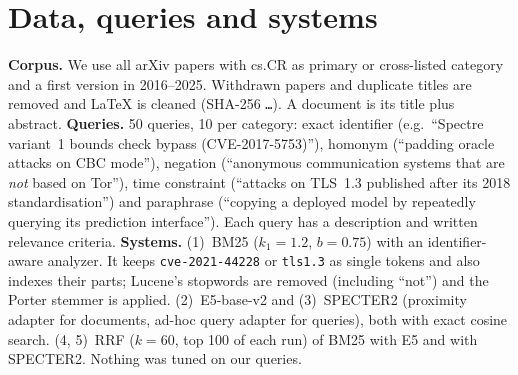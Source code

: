 \documentclass[10pt,a4paper]{article}
\begin{document}
\section{Data, queries and systems}
\textbf{Corpus.} We use all \corpusN{} arXiv papers with cs.CR as primary or cross-listed category
and a first version in 2016--2025. Withdrawn papers and duplicate titles are removed and LaTeX is
cleaned (SHA-256 \texttt{\corpusSha\ldots}). A document is its title plus abstract.
\textbf{Queries.} 50 queries, 10 per category: exact identifier (e.g.\ ``Spectre variant~1 bounds check
bypass (CVE-2017-5753)''), homonym (``padding oracle attacks on CBC mode''), negation (``anonymous
communication systems that are \emph{not} based on Tor''), time constraint (``attacks on TLS~1.3
published after its 2018 standardisation'') and paraphrase (``copying a deployed model by repeatedly
querying its prediction interface''). Each query has a description and written relevance criteria.
\textbf{Systems.} (1)~BM25 ($k_1{=}1.2$, $b{=}0.75$) with an identifier-aware analyzer. It keeps
\texttt{cve-2021-44228} or \texttt{tls1.3} as single tokens and also indexes their parts;
Lucene's stopwords are removed (including ``not'') and the Porter stemmer is applied.
(2)~E5-base-v2 and (3)~SPECTER2 (proximity adapter for documents, ad-hoc query adapter for queries),
both with exact cosine search. (4, 5)~RRF ($k{=}60$, top 100 of each run) of BM25 with E5 and with
SPECTER2. Nothing was tuned on our queries.
\end{document}
